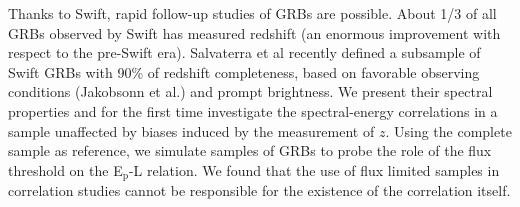 


\bigskip



\bigskip

\noindent Thanks to Swift, rapid follow-up studies of GRBs are possible. About 1/3 of all GRBs observed by Swift has measured redshift (an enormous improvement with respect to the pre-Swift era). Salvaterra et al recently defined a subsample of Swift GRBs with 90\% of redshift completeness, based on favorable observing conditions (Jakobsonn et al.) and prompt brightness. We present their spectral properties and for the first time investigate the spectral-energy correlations in a sample unaffected by biases induced by the measurement of $z$. Using the complete sample as reference, we simulate samples of GRBs to probe the role of the flux threshold on the E$_\mathrm{p}$-L relation. We found that the use of flux limited samples in correlation studies cannot be responsible for the existence of the correlation itself.

